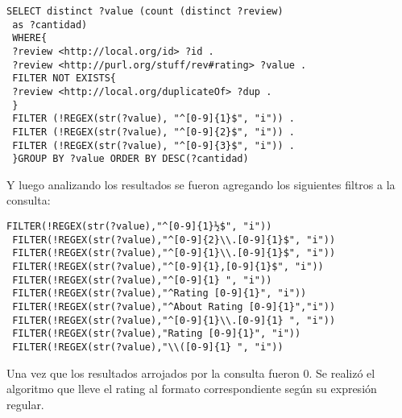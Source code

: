  \begin{lstlisting}[frame=single]
 SELECT distinct ?value (count (distinct ?review)
 as ?cantidad)
 WHERE{ 
 ?review <http://local.org/id> ?id .
 ?review <http://purl.org/stuff/rev#rating> ?value .
 FILTER NOT EXISTS{
 ?review <http://local.org/duplicateOf> ?dup .
 }
 FILTER (!REGEX(str(?value), "^[0-9]{1}$", "i")) .
 FILTER (!REGEX(str(?value), "^[0-9]{2}$", "i")) .
 FILTER (!REGEX(str(?value), "^[0-9]{3}$", "i")) .
 }GROUP BY ?value ORDER BY DESC(?cantidad)
 \end{lstlisting}
 Y luego analizando los resultados se fueron agregando los siguientes filtros a la consulta:\\
 \begin{lstlisting}[frame=single]
 FILTER(!REGEX(str(?value),"^[0-9]{1}½$", "i"))
 FILTER(!REGEX(str(?value),"^[0-9]{2}\\.[0-9]{1}$", "i"))
 FILTER(!REGEX(str(?value),"^[0-9]{1}\\.[0-9]{1}$", "i"))
 FILTER(!REGEX(str(?value),"^[0-9]{1},[0-9]{1}$", "i"))
 FILTER(!REGEX(str(?value),"^[0-9]{1} ", "i"))
 FILTER(!REGEX(str(?value),"^Rating [0-9]{1}", "i"))
 FILTER(!REGEX(str(?value),"^About Rating [0-9]{1}","i"))
 FILTER(!REGEX(str(?value),"^[0-9]{1}\\.[0-9]{1} ", "i"))
 FILTER(!REGEX(str(?value),"Rating [0-9]{1}", "i"))
 FILTER(!REGEX(str(?value),"\\([0-9]{1} ", "i"))
 \end{lstlisting}
 Una vez que los resultados arrojados por la consulta fueron 0. Se realizó el algoritmo que lleve el rating al formato correspondiente 
 según su expresión regular.\\
 
